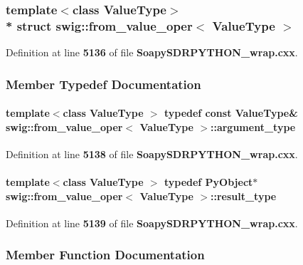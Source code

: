 \subsubsection*{template$<$class Value\+Type$>$\\*
struct swig\+::from\+\_\+value\+\_\+oper$<$ Value\+Type $>$}



Definition at line {\bf 5136} of file {\bf Soapy\+S\+D\+R\+P\+Y\+T\+H\+O\+N\+\_\+wrap.\+cxx}.



\subsubsection{Member Typedef Documentation}
\paragraph[{argument\+\_\+type}]{\setlength{\rightskip}{0pt plus 5cm}template$<$class Value\+Type $>$ typedef const Value\+Type\& {\bf swig\+::from\+\_\+value\+\_\+oper}$<$ Value\+Type $>$\+::{\bf argument\+\_\+type}}\label{structswig_1_1from__value__oper_a0795f6ec6d52f5782097a674c6d24d18}


Definition at line {\bf 5138} of file {\bf Soapy\+S\+D\+R\+P\+Y\+T\+H\+O\+N\+\_\+wrap.\+cxx}.

\paragraph[{result\+\_\+type}]{\setlength{\rightskip}{0pt plus 5cm}template$<$class Value\+Type $>$ typedef Py\+Object$\ast$ {\bf swig\+::from\+\_\+value\+\_\+oper}$<$ Value\+Type $>$\+::{\bf result\+\_\+type}}\label{structswig_1_1from__value__oper_a2599f8d784c6f2cdbe22b72611c367a9}


Definition at line {\bf 5139} of file {\bf Soapy\+S\+D\+R\+P\+Y\+T\+H\+O\+N\+\_\+wrap.\+cxx}.



\subsubsection{Member Function Documentation}
